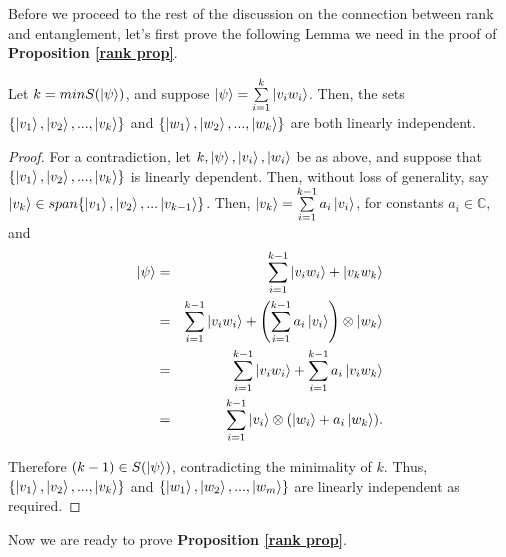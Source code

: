 Before we proceed to the rest of the discussion on the connection between rank and entanglement, let's first prove the following Lemma we need in the proof of \textbf{Proposition \ref{rank prop}}.

\begin{lemma}
\label{independence lemma}
Let $k=min S(\ket{\psi})$, and suppose $\ket{\psi}=\sum\limits_{i=1}^k \ket{v_iw_i}$.  Then, the sets $\{\ket{v_1}, \ket{v_2},...,\ket{v_k}\}$ and $\{\ket{w_1}, \ket{w_2},...,\ket{w_k}\}$ are both linearly independent.
\end{lemma}

\begin{proof}
For a contradiction, let $k, \ket{\psi}, \ket{v_i}, \ket{w_i}$ be as above, and suppose that $\{\ket{v_1}, \ket{v_2},...,\ket{v_k}\}$ is linearly dependent. Then, without loss of generality, say $\ket{v_k} \in span\{\ket{v_1}, \ket{v_2},...\ket{v_{k-1}}\}$. Then, $\ket{v_k}=\sum\limits_{i=1}^{k-1} a_i \ket{v_i}$, for constants $a_i \in \mathbb{C}$, and
\begin{eqnarray*}
\ket{\psi}&=&\sum\limits_{i=1}^{k-1} \ket{v_i w_i} + \ket{v_k w_k}\\
&=&\sum_{i=1}^{k-1} \ket{v_i w_i} + \left(\sum_{i=1}^{k-1} a_i\ket{v_i}\right) \otimes \ket{w_k}\\
&=&\sum_{i=1}^{k-1} \ket{v_i w_i} + \sum_{i=1}^{k-1} a_i\ket{v_iw_k}\\
&=&\sum_{i=1}^{k-1} \ket{v_i} \otimes (\ket{w_i}+a_i\ket{w_k}).\\
\end{eqnarray*}

Therefore $(k-1) \in S(\ket{\psi})$, contradicting the minimality of $k$.  Thus, $\{\ket{v_1}, \ket{v_2},...,\ket{v_k}\}$ and $\{\ket{w_1}, \ket{w_2},...,\ket{w_m}\}$ are linearly independent as required.
\end{proof}

\bigskip
Now we are ready to prove \textbf{Proposition \ref{rank prop}}.

